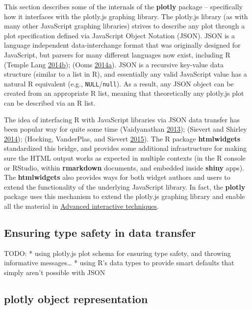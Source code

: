 \documentclass[12pt,]{isuthesis}
\begin{document}
This section describes some of the internals of the \textbf{plotly}
package -- specifically how it interfaces with the plotly.js graphing
library. The plotly.js library (as with many other JavaScript graphing
libraries) strives to describe any plot through a plot specification
defined via JavaScript Object Notation (JSON). JSON is a language
independent data-interchange format that was originally designed for
JavaScript, but parsers for many different languages now exist,
including R (Temple Lang
\protect\hyperlink{ref-RJSONIO}{2014}\protect\hyperlink{ref-RJSONIO}{b});
(Ooms
\protect\hyperlink{ref-jsonlite}{2014}\protect\hyperlink{ref-jsonlite}{a}).
JSON is a recursive key-value data structure (similar to a list in R),
and essentially any valid JavaScript value has a natural R equivalent
(e.g., \texttt{NULL}/\texttt{null}). As a result, any JSON object can be
created from an appropriate R list, meaning that theoretically any
plotly.js plot can be described via an R list.

The idea of interfacing R with JavaScript libraries via JSON data
transfer has been popular way for quite some time (Vaidyanathan
\protect\hyperlink{ref-rCharts}{2013}); (Sievert and Shirley
\protect\hyperlink{ref-Sievert:2014b}{2014}); (Hocking, VanderPlas, and
Sievert \protect\hyperlink{ref-animint}{2015}). The R package
\textbf{htmlwidgets} standardized this bridge, and provides some
additional infrastructure for making sure the HTML output works as
expected in multiple contexts (in the R console or RStudio, within
\textbf{rmarkdown} documents, and embedded inside \textbf{shiny} apps).
The \textbf{htmlwidgets} also provides ways for both widget authors and
users to extend the functionality of the underlying JavaScript library.
In fact, the \textbf{plotly} package uses this mechanism to extend the
plotly.js graphing library and enable all the material in
\href{advanced-interactive-techniques}{Advanced interactive techniques}.

\subsection{Ensuring type safety in data
transfer}\label{ensuring-type-safety-in-data-transfer}

TODO: * using plotly.js plot schema for ensuring type safety, and
throwing informative messages\ldots{} * using R's data types to provide
smart defaults that simply aren't possible with JSON

\subsection{plotly object
representation}\label{plotly-object-representation}
\end{document}
